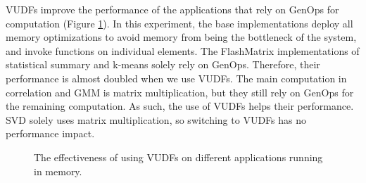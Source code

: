 VUDFs improve the performance of the applications that rely on GenOps
for computation (Figure \ref{perf:opts_CPU}). In this experiment, the base
implementations deploy all memory optimizations to avoid memory from being
the bottleneck of the system, and invoke functions on individual elements.
The FlashMatrix implementations of statistical summary and k-means solely
rely on GenOps. Therefore, their performance is almost doubled
when we use VUDFs. The main computation in correlation and GMM is matrix
multiplication, but they still rely on GenOps for the remaining computation.
As such, the use of VUDFs helps their performance. SVD solely uses matrix
multiplication, so switching to VUDFs has no performance impact.

\begin{figure}
	\begin{center}
		\footnotesize
		\vspace{-15pt}
		
		\vspace{-10pt}
		\caption{The effectiveness of using VUDFs on different applications
		running in memory.}
		\label{perf:opts_CPU}
	\end{center}
\end{figure}
